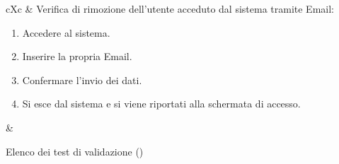 \begin{table}[H]
\begin{VTtable}[1.7]{\textwidth}{cXc}
        \addtotv & Verifica di rimozione dell'utente acceduto dal sistema tramite Email:
        \begin{enumerate}
            \item Accedere al sistema.
            \item Inserire la propria Email.
            \item Confermare l'invio dei dati.
            \item Si esce dal sistema e si viene riportati alla schermata di accesso.
        \end{enumerate}
        & \TNI \\
        \bottomrule
	\end{VTtable}
	\caption{Elenco dei test di validazione (\thetableCounter)}
\end{table}

